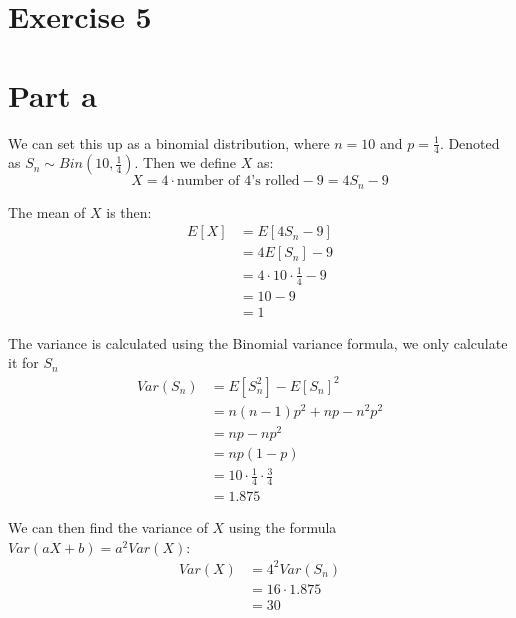 \section{Exercise 5}

\section{Part a}

We can set this up as a binomial distribution, where $n=10$ and $p=\frac{1}{4}$. Denoted as $S_n \sim Bin\left(10, \frac{1}{4}\right)$. Then we define $X$ as:
\[
	X = 4 \cdot \text{number of 4's rolled} - 9 = 4S_n - 9
\]

The mean of $X$ is then:
\begin{align*}
	E[X] & = E[4S_n - 9]                      \\
	     & = 4E[S_n] - 9                      \\
	     & = 4 \cdot 10 \cdot \frac{1}{4} - 9 \\
	     & = 10 - 9                           \\
	     & = 1
\end{align*}

The variance is calculated using the Binomial variance formula, we only calculate it for $S_n$
\begin{align*}
	Var(S_n) & = E[S_n^2]-E[S_n]^2                      \\
	         & = n(n-1)p^2+np - n^2p^2                  \\
	         & = np-np^2                                \\
	         & = np(1-p)                                \\
	         & = 10 \cdot \frac{1}{4} \cdot \frac{3}{4} \\
	         & = 1.875
\end{align*}

We can then find the variance of $X$ using the formula $Var(aX+b) = a^2Var(X)$:
\begin{align*}
	Var(X) & = 4^2Var(S_n)    \\
	       & = 16 \cdot 1.875 \\
	       & = 30
\end{align*}

